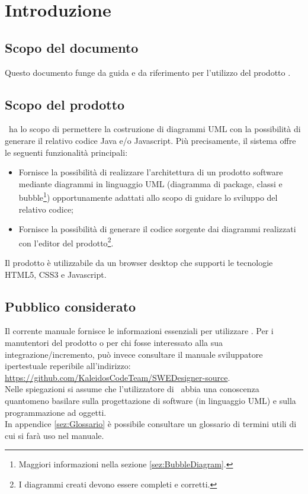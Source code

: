 \documentclass[../ManualeUtente.tex]{subfiles}
\begin{document}
	\section{Introduzione}
		\subsection{Scopo del documento}
			Questo documento funge da guida e da riferimento per l'utilizzo del prodotto
			\progetto.
		\subsection{Scopo del prodotto}
			\progetto\ ha lo scopo di permettere la
			costruzione di diagrammi UML con la possibilità di generare il relativo
			codice Java e/o Javascript.
			Più precisamente, il sistema offre le seguenti funzionalità principali:
			\begin{itemize}
				\item Fornisce la possibilità di realizzare l'architettura di un prodotto software
				mediante diagrammi in linguaggio UML (diagramma di package, classi e
				bubble\footnote{Maggiori informazioni nella sezione \ref{sez:BubbleDiagram}.}) opportunamente
				adattati allo scopo di guidare lo sviluppo del relativo codice;
				\item Fornisce la possibilità di generare il codice sorgente dai diagrammi realizzati
				con l'editor del prodotto\footnote{I diagrammi creati devono essere completi e corretti.}.
			\end{itemize}
			Il prodotto è utilizzabile da un browser desktop che supporti le tecnologie HTML5, CSS3
			e Javascript.
		\subsection{Pubblico considerato}
			Il corrente manuale fornisce le informazioni essenziali per utilizzare \progetto. Per i manutentori
			del prodotto o per chi fosse interessato alla sua integrazione/incremento, può invece consultare il
			manuale	sviluppatore ipertestuale reperibile all'indirizzo:\\
			\url{https://github.com/KaleidosCodeTeam/SWEDesigner-source}.\\
			Nelle spiegazioni si assume che l'utilizzatore di \progetto\ abbia una conoscenza quantomeno
			basilare sulla progettazione di software (in linguaggio UML) e sulla programmazione ad oggetti.\\
			In appendice \ref{sez:Glossario} è possibile consultare un glossario di termini utili di cui si
			farà uso nel manuale.
\end{document}
